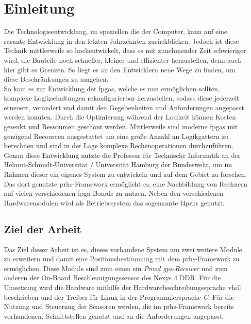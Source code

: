 \chapter{Einleitung}\label{ch:einleitung}

Die Technologieentwicklung, im speziellen die der Computer, kann auf eine rasante Entwicklung in den letzten
Jahrzehnten zurückblicken. Jedoch ist diese Technik mittlerweile so hochentwickelt, dass es mit zunehmender Zeit
schwieriger wird, die Bauteile noch schneller, kleiner und effizienter herzustellen, denn auch hier gibt es Grenzen.
So liegt es an den Entwicklern neue Wege zu finden, um diese Beschränkungen zu umgehen. \\
So kam es zur Entwicklung der \acp{fpga}, welche es nun ermöglichen sollten, komplexe Logikschaltungen
rekonfigurierbar herzustellen, sodass diese jederzeit erneuert, verändert und damit den Gegebenheiten und
Anforderungen angepasst werden konnten. Durch die Optimierung während der Laufzeit können Kosten gesenkt und
Ressourcen geschont werden. Mittlerweile sind moderne \acp{fpga} mit genügend Recourcen ausgestattet um eine
große Anzahl an Logikgattern zu berechnen und sind in der Lage komplexe Rechenoperationen durchzuführen.\\
Genau diese Entwicklung nutzte die Professur für Technische Informatik an der
Helmut-Schmidt-Universität / Universität Hamburg der Bundeswehr, um im Rahmen dieser ein eigenes
System zu entwickeln und auf dem Gebiet zu forschen. Das dort genutzte \ac{prhs}-Framework ermöglicht es,
eine Nachbildung von Rechnern auf vielen verschiedenen \ac{fpga}-Boards zu nutzen. Neben den
verschiedenen Hardwaremodulen wird als Betriebssystem das sogenannte \ac{l4prhs} genutzt.

\section{Ziel der Arbeit}\label{kap:zielderarbeit}

Das Ziel dieser Arbeit ist es, dieses vorhandene System um zwei weitere Module zu erweitern und damit
eine Positionsbestimmung mit dem \ac{prhs}-Framework zu ermöglichen. Diese Module sind zum einen
ein \emph{Pmod \ac{gps}-Receiver} und zum anderen der On-Board Beschleunigungssensor des Nexys 4 DDR. Für die
Umsetzung wird die Hardware mithilfe der Hardwarebeschreibungssprache \ac{vhdl} beschrieben und der Treiber für Linux
in der Programmiersprache \emph{C}. Für die Nutzung und Steuerung der
Sensoren werden, die im \ac{prhs}-Framework bereits vorhandenen, Schnittstellen genutzt und an die Anforderungen angepasst.

